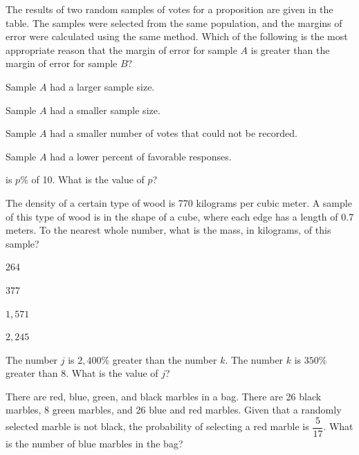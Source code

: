 \vfill
\clearpage
\noindent\begin{minipage}{\linewidth}
\par\smallskip
The results of two random samples of votes for a proposition are given in the table. The samples were selected from the same population, and the margins of error were calculated using the same method. Which of the following is the most appropriate reason that the margin of error for sample $A$ is greater than the margin of error for sample $B$?
\satfig{\figtblsamples}
\begin{satchoices}
  \item[A)] Sample $A$ had a larger sample size.
  \item[B)] Sample $A$ had a smaller sample size.
  \item[C)] Sample $A$ had a smaller number of votes that could not be recorded.
  \item[D)] Sample $A$ had a lower percent of favorable responses.
\end{satchoices}
\end{minipage}
\vfill
\noindent\begin{minipage}{\linewidth}
\par{} is $p\%$ of 10. What is the value of $p$?
\end{minipage}
\vfill
\noindent\begin{minipage}{\linewidth}
\par\smallskip
The density of a certain type of wood is 770 kilograms per cubic meter. A sample of this type of wood is in the shape of a cube, where each edge has a length of 0.7 meters. To the nearest whole number, what is the mass, in kilograms, of this sample?
\begin{satchoices}
  \item[A)] $264$
  \item[B)] $377$
  \item[C)] $1{,}571$
  \item[D)] $2{,}245$
\end{satchoices}
\end{minipage}
\vfill
\clearpage
\noindent\begin{minipage}{\linewidth}
\par\smallskip
The number $j$ is $2{,}400\%$ greater than the number $k$. The number $k$ is $350\%$ greater than 8. What is the value of $j$?
\end{minipage}
\vfill
\noindent\begin{minipage}{\linewidth}
\par\smallskip
There are red, blue, green, and black marbles in a bag. There are 26 black marbles, 8 green marbles, and 26 blue and red marbles. Given that a randomly selected marble is not black, the probability of selecting a red marble is $\dfrac{5}{17}$. What is the number of blue marbles in the bag?
\end{minipage}
